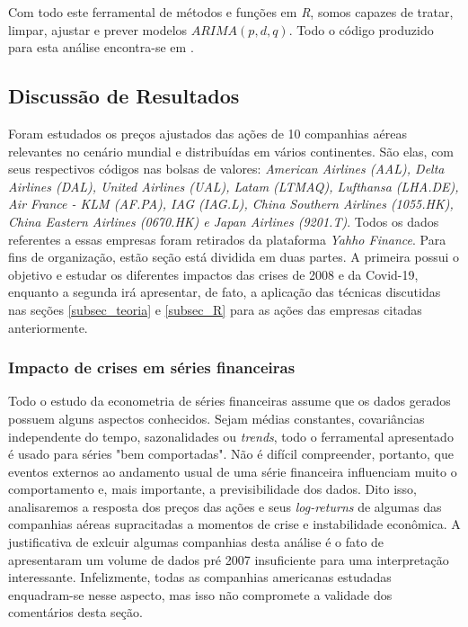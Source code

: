 \documentclass[12pt]{article}
\begin{document}
Com todo este ferramental de métodos e funções em \textit{R}, somos capazes de tratar, limpar, ajustar e prever modelos $ARIMA(p,d,q)$. Todo o código produzido para esta análise encontra-se em \cite{git}.
\subsection{Discussão de Resultados}\label{subsec_res}
Foram estudados os preços ajustados das ações de 10 companhias aéreas relevantes no cenário mundial e distribuídas em vários continentes. São elas, com seus respectivos códigos nas bolsas de valores: \emph{American Airlines (AAL), Delta Airlines (DAL), United Airlines (UAL), Latam (LTMAQ), Lufthansa (LHA.DE), Air France - KLM (AF.PA), IAG (IAG.L), China Southern Airlines (1055.HK), China Eastern Airlines (0670.HK) e Japan Airlines (9201.T)}. Todos os dados referentes a essas empresas foram retirados da plataforma \textit{Yahho Finance}. Para fins de organização, estão seção está dividida em duas partes. A primeira possui o objetivo e estudar os diferentes impactos das crises de 2008 e da Covid-19, enquanto a segunda irá apresentar, de fato, a aplicação das técnicas discutidas nas seções \ref{subsec_teoria} e \ref{subsec_R} para as ações das empresas citadas anteriormente.

\subsubsection{Impacto de crises em séries financeiras}\label{subsec_crise}
Todo o estudo da econometria de séries financeiras \cite{Tsay} assume que os dados gerados possuem alguns aspectos conhecidos. Sejam médias constantes, covariâncias independente do tempo, sazonalidades ou \textit{trends}, todo o ferramental apresentado é usado para séries "bem comportadas". Não é difícil compreender, portanto, que eventos externos ao andamento usual de uma série financeira influenciam muito o comportamento e, mais importante, a previsibilidade dos dados. Dito isso, analisaremos a resposta dos preços das ações e seus \textit{log-returns} de algumas das companhias aéreas supracitadas a momentos de crise e instabilidade econômica. A justificativa de exlcuir algumas companhias desta análise é o fato de apresentaram um volume de dados pré 2007 insuficiente para uma interpretação interessante. Infelizmente, todas as companhias americanas estudadas enquadram-se nesse aspecto, mas isso não compromete a validade dos comentários desta seção.
\end{document}
